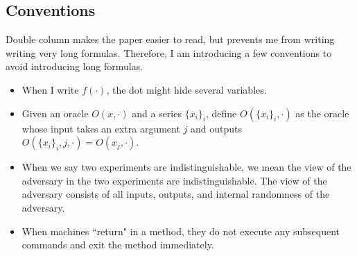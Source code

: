\subsection{Conventions}
Double column makes the paper easier to read, but prevents me from writing writing very long formulas. Therefore, I am introducing a few conventions to avoid introducing long formulas.
\begin{itemize}
    \item When I write $f(\cdot)$, the dot might hide several variables.
    
    \item Given an oracle $O(x, \cdot)$ and a series $\{x_i\}_i$, define $O(\{x_i\}_i, \cdot)$ as the oracle whose input takes an extra argument $j$ and outputs $O(\{x_i\}_i, j, \cdot) = O(x_j, \cdot)$.

    \item When we say two experiments are indistinguishable, we mean the view of the adversary in the two experiments are indistinguishable. The view of the adversary consists of all inputs, outputs, and internal randomness of the adversary.
    
    \item When machines ``return" in a method, they do not execute any subsequent commands and exit the method immediately.
\end{itemize}